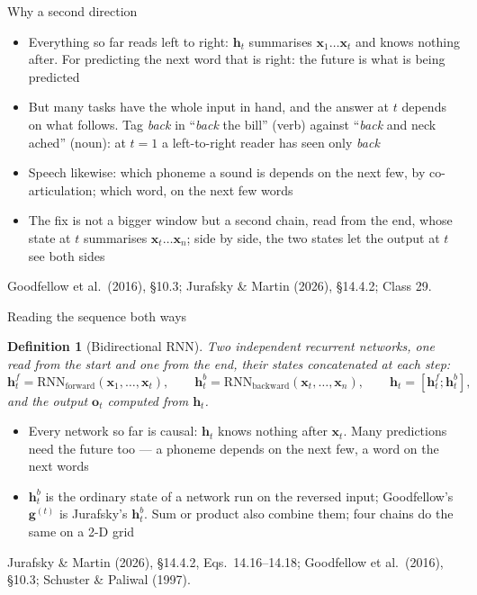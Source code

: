 \documentclass[aspectratio=169, 11pt]{beamer}
\newtheorem{defx}[theorem]{Definition}
\newcommand{\srcline}[1]{%
  \par\vspace{0.25em}%
  {\scriptsize\color{mcMuted}\hfill #1\par}}
\begin{document}
\begin{frame}{Why a second direction}
  \vspace{0.05em}
  {\footnotesize
  \begin{itemize}\itemsep0.25em
    \item Everything so far reads \alert{left to right}: $\mathbf{h}_t$
          summarises $\mathbf{x}_1 \ldots \mathbf{x}_t$ and knows nothing after.
          For predicting the next word that is right: the future is what
          is being predicted
    \item But many tasks have the \alert{whole input in hand}, and the
          answer at $t$ depends on what follows. Tag \emph{back} in
          ``\emph{back} the bill'' (verb) against ``\emph{back} and neck
          ached'' (noun): at $t = 1$ a left-to-right reader has seen only
          \emph{back}
    \item Speech likewise: which phoneme a sound is depends on the next
          few, by co-articulation; which word, on the next few words
    \item The fix is not a bigger window but a \alert{second chain}, read
          from the end, whose state at $t$ summarises $\mathbf{x}_t \ldots \mathbf{x}_n$;
          side by side, the two states let the output at $t$ see both sides
  \end{itemize}}
  \srcline{Goodfellow et al.\ (2016), \S10.3; Jurafsky \& Martin (2026), \S14.4.2; Class 29.}
\end{frame}
\begin{frame}{Reading the sequence both ways}
  \vspace{-0.45em}
  \begin{defx}[Bidirectional RNN]\label{th:bi}
    \small
    Two independent recurrent networks, one read from the start and one
    from the end, their states concatenated at each step:
    \[
      \mathbf{h}^{f}_t = \mathrm{RNN}_{\mathrm{forward}}(\mathbf{x}_1, \ldots, \mathbf{x}_t), \qquad
      \mathbf{h}^{b}_t = \mathrm{RNN}_{\mathrm{backward}}(\mathbf{x}_t, \ldots, \mathbf{x}_n), \qquad
      \mathbf{h}_t = [\mathbf{h}^{f}_t ; \mathbf{h}^{b}_t],
    \]
    and the output $\mathbf{o}_t$ computed from $\mathbf{h}_t$.
  \end{defx}
  \vspace{-0.1em}
  {\footnotesize
  \begin{itemize}\itemsep0.16em
    \item Every network so far is \alert{causal}: $\mathbf{h}_t$ knows
          nothing after $\mathbf{x}_t$. Many predictions need the future
          too --- a phoneme depends on the next few, a word on the next words
    \item $\mathbf{h}^{b}_t$ is the ordinary state of a network run on the
          reversed input; Goodfellow's $\mathbf{g}^{(t)}$ is Jurafsky's
          $\mathbf{h}^{b}_t$. Sum or product also combine them; four chains
          do the same on a 2-D grid
  \end{itemize}}
  \vspace{-0.3em}
  \srcline{Jurafsky \& Martin (2026), \S14.4.2, Eqs.~14.16--14.18; Goodfellow et al.\ (2016), \S10.3; Schuster \& Paliwal (1997).}
\end{frame}
\end{document}
